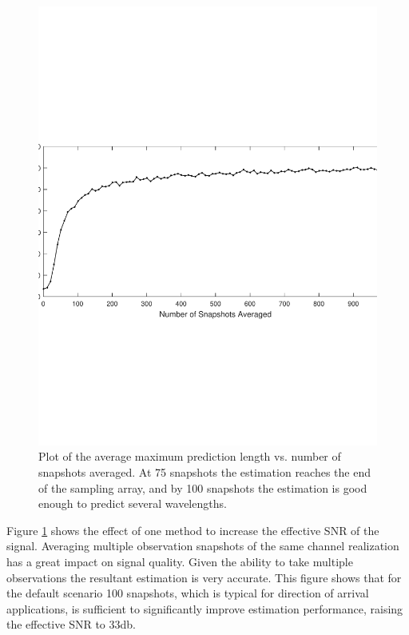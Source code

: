 \documentclass{allertonproc}
\begin{document}
\begin{figure}[tbp]
\begin{center}
\includegraphics[width=6in]{numSnapshots}
\caption{Plot of the average maximum prediction length vs. number of snapshots averaged. At 75 snapshots the estimation reaches the end of the sampling array, and by 100 snapshots the estimation is good enough to predict several wavelengths.}\label{snapshot}
\end{center}
\end{figure}
Figure \ref{snapshot} shows the effect of one method to increase the effective SNR of the signal. Averaging multiple observation snapshots of the same channel realization has a great impact on signal quality. Given the ability to take multiple observations the resultant estimation is very accurate. This figure shows that for the default scenario 100 snapshots, which is typical for direction of arrival applications, is sufficient to significantly improve estimation performance, raising the effective SNR to $33$db. 
\end{document}
